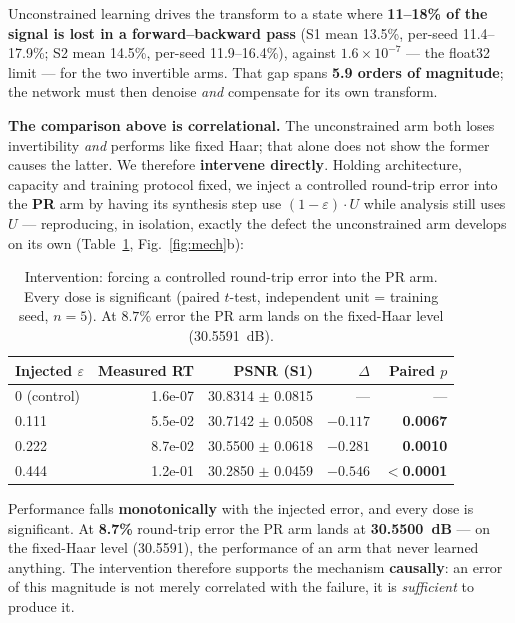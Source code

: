\documentclass[conference]{IEEEtran}
\begin{document}
Unconstrained learning drives the transform to a state where \textbf{11--18\% of
the signal is lost in a forward--backward pass} (S1 mean 13.5\%, per-seed
11.4--17.9\%; S2 mean 14.5\%, per-seed 11.9--16.4\%), against
$1.6\times10^{-7}$ --- the float32 limit --- for the two invertible arms. That
gap spans \textbf{5.9 orders of magnitude}; the network must then denoise
\emph{and} compensate for its own transform.

\textbf{The comparison above is correlational.} The unconstrained arm both loses
invertibility \emph{and} performs like fixed Haar; that alone does not show the
former causes the latter. We therefore \textbf{intervene directly}. Holding
architecture, capacity and training protocol fixed, we inject a controlled
round-trip error into the \textbf{PR} arm by having its synthesis step use
$(1-\varepsilon)\cdot U$ while analysis still uses $U$ --- reproducing, in
isolation, exactly the defect the unconstrained arm develops on its own
(Table~\ref{tab:interv}, Fig.~\ref{fig:mech}b):

\begin{table}[t]
\centering
\caption{Intervention: forcing a controlled round-trip error into the PR arm.
Every dose is significant (paired $t$-test, independent unit = training seed,
$n=5$). At $8.7\%$ error the PR arm lands on the fixed-Haar level (30.5591~dB).}
\label{tab:interv}
\small
\begin{tabular}{@{}lrrrr@{}}
\toprule
Injected $\varepsilon$ & Measured RT & PSNR (S1) & $\Delta$ & Paired $p$\\
\midrule
0 (control) & 1.6e-07 & 30.8314 $\pm$ 0.0815 & --- & ---\\
0.111 & 5.5e-02 & 30.7142 $\pm$ 0.0508 & $-0.117$ & \textbf{0.0067}\\
0.222 & 8.7e-02 & 30.5500 $\pm$ 0.0618 & $-0.281$ & \textbf{0.0010}\\
0.444 & 1.2e-01 & 30.2850 $\pm$ 0.0459 & $-0.546$ & \textbf{$<$0.0001}\\
\bottomrule
\end{tabular}
\end{table}

Performance falls \textbf{monotonically} with the injected error, and every dose
is significant. At \textbf{8.7\%} round-trip error the PR arm lands at
\textbf{30.5500~dB} --- on the fixed-Haar level (30.5591), the performance of an
arm that never learned anything. The intervention therefore supports the
mechanism \textbf{causally}: an error of this magnitude is not merely correlated
with the failure, it is \emph{sufficient} to produce it.
\end{document}
